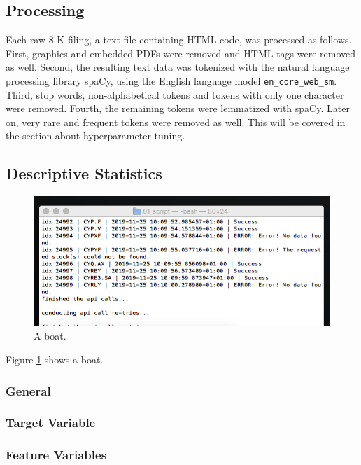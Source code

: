 \documentclass{article}
\begin{document}
	\subsection{Processing}
	
	Each raw 8-K filing, a text file containing HTML code, was processed as follows. First, graphics and embedded PDFs were removed and HTML tags were removed as well. Second, the resulting text data was tokenized with the natural language processing library spaCy, using the English language model \lstinline{en_core_web_sm}. Third, stop words, non-alphabetical tokens and tokens with only one character were removed. Fourth, the remaining tokens were lemmatized with spaCy. Later on, very rare and frequent tokens were removed as well. This will be covered in the section about hyperparameter tuning. 
	
	
	\subsection{Descriptive Statistics}
	
	\begin{figure}[h]
		\includegraphics[width=\linewidth]{img/test.png}
		\caption{A boat.}
		\label{fig:boat1}
	\end{figure}
	
	Figure \ref{fig:boat1} shows a boat.
	
	\subsubsection{General}
	
	\subsubsection{Target Variable}
	
	\subsubsection{Feature Variables}
	
\end{document}
